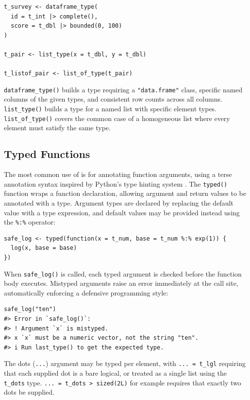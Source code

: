 \begin{verbatim}
t_survey <- dataframe_type(
  id = t_int |> complete(),
  score = t_dbl |> bounded(0, 100)
)

t_pair <- list_type(x = t_dbl, y = t_dbl)

t_listof_pair <- list_of_type(t_pair)
\end{verbatim}

\texttt{dataframe\_type()} builds a type requiring a \texttt{"data.frame"} class, specific named columns of the given types, and consistent row counts across all columns. \texttt{list\_type()} builds a type for a named list with specific element types. \texttt{list\_of\_type()} covers the common case of a homogeneous list where every element must satisfy the same type.

\subsection{Typed Functions}\label{sec-typed-functions}

The most common use of  is for annotating function arguments, using a terse annotation syntax inspired by Python's type hinting system \citep{pep484}. The \texttt{typed()} function wraps a function declaration, allowing argument and return values to be annotated with a type. Argument types are declared by replacing the default value with a type expression, and default values may be provided instead using the \texttt{\%:\%} operator:

\begin{verbatim}
safe_log <- typed(function(x = t_num, base = t_num %:% exp(1)) {
  log(x, base = base)
})
\end{verbatim}

When \texttt{safe\_log()} is called, each typed argument is checked before the function body executes. Mistyped arguments raise an error immediately at the call site, automatically enforcing a defensive programming style:

\begin{verbatim}
safe_log("ten")
#> Error in `safe_log()`:
#> ! Argument `x` is mistyped.
#> x `x` must be a numeric vector, not the string "ten".
#> i Run last_type() to get the expected type.
\end{verbatim}

The dots (\texttt{...}) argument may be typed per element, with \texttt{...\ =\ t\_lgl} requiring that each supplied dot is a bare logical, or treated as a single list using the \texttt{t\_dots} type. \texttt{...\ =\ t\_dots\ \textbar{}\textgreater{}\ sized(2L)} for example requires that exactly two dots be supplied.

